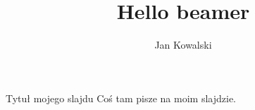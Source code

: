 \documentclass{beamer}
\title{Hello beamer}
\author{Jan Kowalski}
\begin{document}
\begin{frame}
\titlepage
\end{frame}
\begin{frame}{Tytuł mojego slajdu}
Coś tam pisze na moim slajdzie.
\end{frame}
\end{document}
